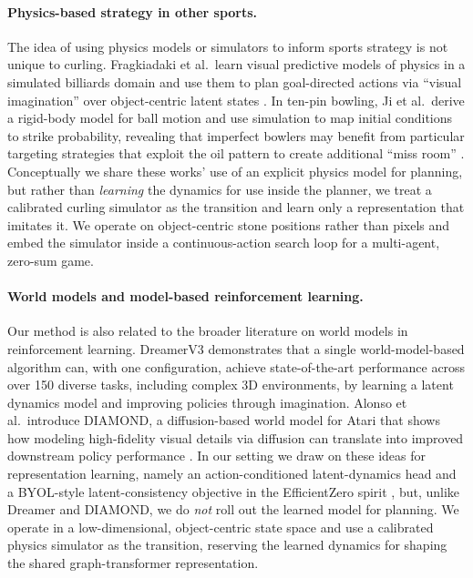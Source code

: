 \documentclass[11pt]{article}
\begin{document}
\paragraph{Physics-based strategy in other sports.}
The idea of using physics models or simulators to inform sports strategy
is not unique to curling. Fragkiadaki et al.\ learn visual predictive models
of physics in a simulated billiards domain and use them to plan goal-directed
actions via ``visual imagination'' over object-centric latent states
\cite{fragkiadaki2015learning}. In ten-pin bowling, Ji et al.\ derive a
rigid-body model for ball motion and use simulation to map initial conditions
to strike probability, revealing that imperfect bowlers may benefit from
particular targeting strategies that exploit the oil pattern to create
additional ``miss room'' \cite{ji2022using}. Conceptually we share these
works' use of an explicit physics model for planning, but rather than
\emph{learning} the dynamics for use inside the planner, we treat a
calibrated curling simulator as the transition and learn only a
representation that imitates it. We operate on object-centric stone positions
rather than pixels and embed the simulator inside a continuous-action search
loop for a multi-agent, zero-sum game.

\paragraph{World models and model-based reinforcement learning.}
Our method is also related to the broader literature on world models in
reinforcement learning. DreamerV3 \cite{hafner2023mastering} demonstrates that
a single world-model-based algorithm can, with one configuration, achieve
state-of-the-art performance across over 150 diverse tasks, including complex
3D environments, by learning a latent dynamics model and improving policies
through imagination. Alonso et al.\ introduce DIAMOND, a diffusion-based
world model for Atari that shows how modeling high-fidelity visual details
via diffusion can translate into improved downstream policy performance
\cite{alonso2024diffusion}. In our setting we draw on these ideas for
representation learning, namely an action-conditioned latent-dynamics head
and a BYOL-style latent-consistency objective \cite{grill2020bootstrap} in
the EfficientZero spirit \cite{ye2021mastering}, but, unlike Dreamer and
DIAMOND, we do \emph{not} roll out the learned model for planning. We operate
in a low-dimensional, object-centric state space and use a calibrated physics
simulator as the transition, reserving the learned dynamics for shaping the
shared graph-transformer representation.
\end{document}
